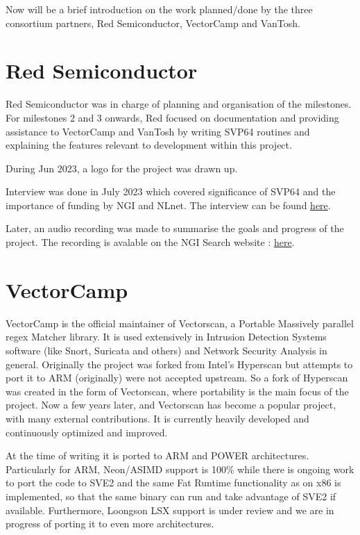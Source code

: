 Now will be a brief introduction on the work planned/done by the three
consortium partners, Red Semiconductor, VectorCamp and VanTosh.

\section{Red Semiconductor}

Red Semiconductor was in charge of planning and organisation of the milestones.
For milestones 2 and 3 onwards, Red focused on documentation and providing
assistance to VectorCamp and VanTosh by writing \acrshort{SVP64} routines and explaining
the features relevant to development within this project.

During Jun 2023, a logo for the project was drawn up.

Interview was done in July 2023 which covered significance of \acrshort{SVP64} and
the importance of funding by \acrshort{NGI} and NLnet.
The interview can be found
\href{https://spaces.fundingbox.com/spaces/ngi-community-ngi-innovators/64b8dadbabf7a659885ee01e}{here}.

Later, an audio recording was made to summarise the goals and progress of the
project. The recording is avalable on the NGI Search website :
\href{https://www.ngisearch.eu/view/Events/OC1Searchers}{here}.

\section{VectorCamp}

VectorCamp is the official maintainer of Vectorscan, a Portable Massively
parallel \acrfull{regex} Matcher library. It is used extensively in
Intrusion Detection Systems software (like Snort, Suricata and others)
and Network Security Analysis in general. Originally the project was forked
from Intel’s Hyperscan but attempts to port it to ARM (originally) were not
accepted upstream. So a fork of Hyperscan was created in the form of
Vectorscan, where portability is the main focus of the project.
Now a few years later, and Vectorscan has become a popular project,
with many external contributions. It is currently heavily developed and
continuously optimized and improved.

At the time of writing it is ported
to ARM and \acrshort{POWER} architectures. Particularly for ARM, Neon/ASIMD support
is 100\% while there is ongoing work to port the code to \acrshort{SVE2} and
the same Fat Runtime functionality as on x86 is implemented,
so that the same binary can run and take advantage of \acrshort{SVE2} if available.
Furthermore, Loongson LSX support is under review and we are in progress of
porting it to even more architectures.

